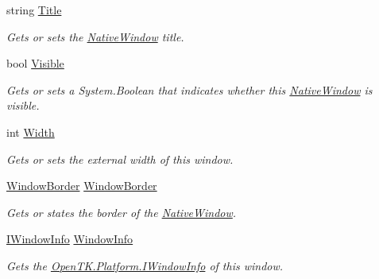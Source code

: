 \begin{DoxyCompactItemize}
string \hyperlink{class_open_t_k_1_1_native_window_af5cd587c921ef6c10709fc69a1e2900b}{Title}
\begin{DoxyCompactList}\small\item\em Gets or sets the \hyperlink{class_open_t_k_1_1_native_window}{Native\-Window} title. \end{DoxyCompactList}\item 
bool \hyperlink{class_open_t_k_1_1_native_window_aff1fe36bb34bb3ba53814a7aaceea940}{Visible}
\begin{DoxyCompactList}\small\item\em Gets or sets a System.\-Boolean that indicates whether this \hyperlink{class_open_t_k_1_1_native_window}{Native\-Window} is visible. \end{DoxyCompactList}\item 
int \hyperlink{class_open_t_k_1_1_native_window_a0cea0939dfd9dc512757e80cfa588de6}{Width}
\begin{DoxyCompactList}\small\item\em Gets or sets the external width of this window. \end{DoxyCompactList}\item 
\hyperlink{namespace_open_t_k_a20f46792b5471ff32362bd0a29fa5f1c}{Window\-Border} \hyperlink{class_open_t_k_1_1_native_window_a847af2dd07cb323f3a96767bb96ea44b}{Window\-Border}
\begin{DoxyCompactList}\small\item\em Gets or states the border of the \hyperlink{class_open_t_k_1_1_native_window}{Native\-Window}. \end{DoxyCompactList}\item 
\hyperlink{interface_open_t_k_1_1_platform_1_1_i_window_info}{I\-Window\-Info} \hyperlink{class_open_t_k_1_1_native_window_a1593f5f56e2bd9b67f9559385aba81de}{Window\-Info}
\begin{DoxyCompactList}\small\item\em Gets the \hyperlink{interface_open_t_k_1_1_platform_1_1_i_window_info}{Open\-T\-K.\-Platform.\-I\-Window\-Info} of this window. \end{DoxyCompactList}\item 

\end{DoxyCompactItemize}
